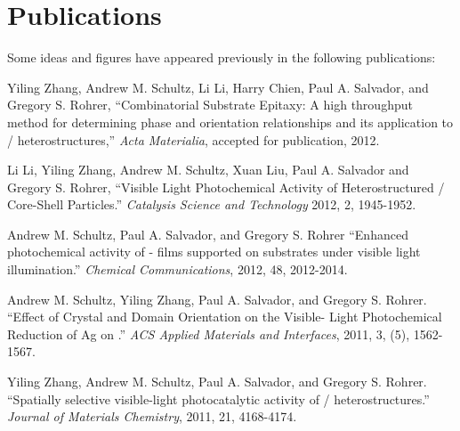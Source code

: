 \chapter*{Publications}

Some ideas and figures have appeared previously in the following 
publications:



\begin{items}

\item Yiling Zhang, Andrew M. Schultz, Li Li, Harry Chien, Paul A. 
	Salvador, and Gregory S. Rohrer, ``Combinatorial Substrate Epitaxy: A 
	high throughput method for determining phase and orientation 
	relationships and its application to / 
	heterostructures,'' \emph{Acta Materialia}, accepted for publication, 
	2012.

\item Li Li, Yiling Zhang, Andrew M. Schultz, Xuan Liu, Paul A. Salvador 
	and Gregory S. Rohrer, ``Visible Light Photochemical Activity of 
	Heterostructured / Core-Shell Particles.'' 
	\emph{Catalysis Science and Technology} 2012, 2, 1945-1952.

\item Andrew M. Schultz, Paul A. Salvador, and Gregory S. Rohrer 
	``Enhanced photochemical activity of \textalpha- films 
	supported on  substrates under visible light 
	illumination.'' \emph{Chemical Communications}, 2012, 48, 2012-2014.

\item Andrew M. Schultz, Yiling Zhang, Paul A. Salvador, and Gregory S. 
	Rohrer. ``Effect of Crystal and Domain Orientation on the Visible-
	Light Photochemical Reduction of Ag on .'' \emph{ACS 
	Applied Materials and Interfaces}, 2011, 3, (5), 1562-1567.

\item Yiling Zhang, Andrew M. Schultz, Paul A. Salvador, and Gregory S. 
	Rohrer. ``Spatially selective visible-light photocatalytic activity 
	of / heterostructures.'' \emph{Journal of 
	Materials Chemistry}, 2011, 21, 4168-4174.

\end{items}

